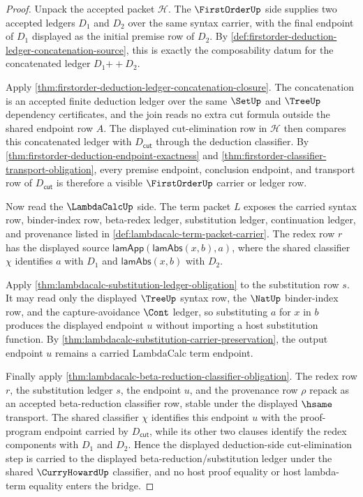 \begin{proof}
Unpack the accepted packet $\mathcal H$. The $\FirstOrderUp$ side supplies two accepted ledgers $D_1$ and $D_2$ over the same syntax carrier, with the final endpoint of $D_1$ displayed as the initial premise row of $D_2$. By \autoref{def:firstorder-deduction-ledger-concatenation-source}, this is exactly the composability datum for the concatenated ledger $D_1 \mathbin{+\!\!+} D_2$.

Apply \autoref{thm:firstorder-deduction-ledger-concatenation-closure}. The concatenation is an accepted finite deduction ledger over the same $\SetUp$ and $\TreeUp$ dependency certificates, and the join reads no extra cut formula outside the shared endpoint row $A$. The displayed cut-elimination row in $\mathcal H$ then compares this concatenated ledger with $D_{\mathsf{cut}}$ through the deduction classifier. By \autoref{thm:firstorder-deduction-endpoint-exactness} and \autoref{thm:firstorder-classifier-transport-obligation}, every premise endpoint, conclusion endpoint, and transport row of $D_{\mathsf{cut}}$ is therefore a visible $\FirstOrderUp$ carrier or ledger row.

Now read the $\LambdaCalcUp$ side. The term packet $L$ exposes the carried syntax row, binder-index row, beta-redex ledger, substitution ledger, continuation ledger, and provenance listed in \autoref{def:lambdacalc-term-packet-carrier}. The redex row $r$ has the displayed source $\mathsf{lamApp}(\mathsf{lamAbs}(x,b),a)$, where the shared classifier $\chi$ identifies $a$ with $D_1$ and $\mathsf{lamAbs}(x,b)$ with $D_2$.

Apply \autoref{thm:lambdacalc-substitution-ledger-obligation} to the substitution row $s$. It may read only the displayed $\TreeUp$ syntax row, the $\NatUp$ binder-index row, and the capture-avoidance $\Cont$ ledger, so substituting $a$ for $x$ in $b$ produces the displayed endpoint $u$ without importing a host substitution function. By \autoref{thm:lambdacalc-substitution-carrier-preservation}, the output endpoint $u$ remains a carried LambdaCalc term endpoint.

Finally apply \autoref{thm:lambdacalc-beta-reduction-classifier-obligation}. The redex row $r$, the substitution ledger $s$, the endpoint $u$, and the provenance row $\rho$ repack as an accepted beta-reduction classifier row, stable under the displayed $\hsame$ transport. The shared classifier $\chi$ identifies this endpoint $u$ with the proof-program endpoint carried by $D_{\mathsf{cut}}$, while its other two clauses identify the redex components with $D_1$ and $D_2$. Hence the displayed deduction-side cut-elimination step is carried to the displayed beta-reduction/substitution ledger under the shared $\CurryHowardUp$ classifier, and no host proof equality or host lambda-term equality enters the bridge.
\end{proof}

